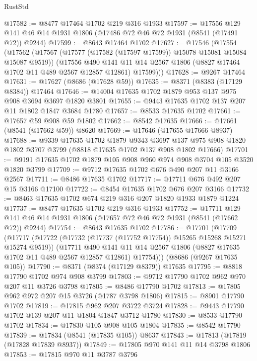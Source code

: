 \begin{lexlean}{RustStd}
\begin{coremodule}
@17582 := @8477 @17464 @1702 @219 @316 @1933
@17597 := @17556 @129 @141 @46 @14 @1931 @1806 (@17486 @72 @46 @72 @1931 (@8541 (@17491 @72)) @9244)
@17599 := @8643 @17464 @1702
@17627 := @17546
    (@17554
      (@17562
        (@17567 (@17577 (@17582 (@17597 @17599)) @15078 @15081 @15084 @15087 @9519))
        (@17556
          @490
          @141
          @11
          @14
          @2567
          @1806
          (@8827 @17464 @1702 @11 @489 @2567 @12857 @12861)
          @17599)))
@17628 := @9267 @17464
@17631 := @17627 (@8686 (@17628 @59))
@17635 := @8371 (@8383 (@17129 @8384)) @17464
@17646 := @14004 @17635 @1702 @1879 @953 @137 @975 @908 @3694 @3697 @1820 @3801
@17655 := @9443 @17635 @1702 @137 @207 @11 @1802 @1847 @3684 @1780
@17657 := @8533 @17635 @1702
@17661 := @17657 @59 @908 @59 @1802
@17662 := @8542 @17635
@17666 := @17661 (@8541 (@17662 @59)) @8620
@17669 := @17646 (@17655 @17666 @8937)
@17688 := @9339
    @17635
    @1702
    @1879
    @9343
    @3697
    @137
    @975
    @908
    @1820
    @1802
    @3707
    @3799
    (@8818 @17635 @1702 @137 @908 @1802 @17666)
@17701 := @9191 @17635 @1702 @1879 @105 @908 @960 @974 @908 @3704 @105 @3520 @1820 @3799
@17709 := @9712 @17635 @1702 @676 @490 @207 @11 @3166 @2567
@17711 := @8486 @17635 @1702
@17717 := @17711 @676 @492 @207 @15 @3166 @17100
@17722 := @8454 @17635 @1702 @676 @207 @3166
@17732 := @8463 @17635 @1702 @674 @219 @316 @207 @1820 @1933 @1879 @1224
@17737 := @8477 @17635 @1702 @219 @316 @1933
@17752 := @17711 @129 @141 @46 @14 @1931 @1806 (@17657 @72 @46 @72 @1931 (@8541 (@17662 @72)) @9244)
@17754 := @8643 @17635 @1702
@17786 := @17701
    (@17709
      (@17717
        (@17722 (@17732 (@17737 (@17752 @17754)) @15265 @15268 @15271 @15274 @9519))
        (@17711
          @490
          @141
          @11
          @14
          @2567
          @1806
          (@8827 @17635 @1702 @11 @489 @2567 @12857 @12861)
          @17754)))
    (@8686 (@9267 @17635 @105))
@17790 := @8371 (@8374 (@17129 @8379)) @17635
@17795 := @8818 @17790 @1702 @974 @908 @3799
@17803 := @9712 @17790 @1702 @962 @970 @207 @11 @3726 @3798
@17805 := @8486 @17790 @1702
@17813 := @17805 @962 @972 @207 @15 @3726 (@1787 @3798 @1806)
@17815 := @8901 @17790 @1702
@17819 := @17815 @962 @207 @3722 @3724
@17828 := @9443 @17790 @1702 @139 @207 @11 @1804 @1847 @3712 @1780
@17830 := @8533 @17790 @1702
@17834 := @17830 @105 @908 @105 @1804
@17835 := @8542 @17790
@17839 := @17834 (@8541 (@17835 @105)) @8637
@17843 := @17813 (@17819 (@17828 @17839 @8937))
@17849 := @17805 @970 @141 @11 @14 @3798 @1806
@17853 := @17815 @970 @11 @3787 @3796

\end{coremodule}
\end{lexlean}
